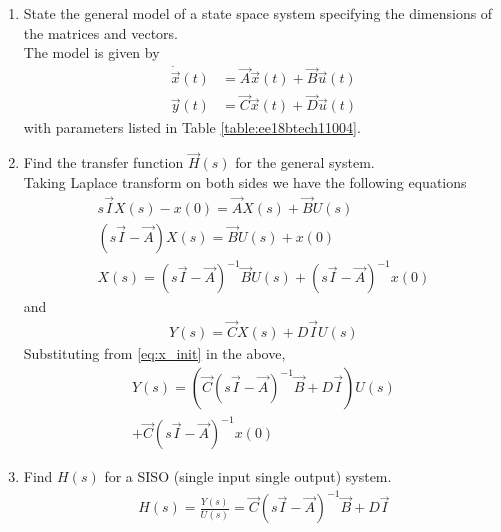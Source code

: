 
\begin{enumerate}[label=\thesection.\arabic*.,ref=\thesection.\theenumi]
\item State the general model of a state space system specifying the dimensions of the matrices and vectors.
\\
\solution The model is given by 
\begin{align}
\dot{\vec{x}}(t)&=\vec{A}\vec{x}(t)+\vec{B}\vec{u}(t) \\
 \vec{y}(t)&=\vec{C}\vec{x}(t)+\vec{D} \vec{u}(t)
\end{align}
%
with parameters listed in Table \ref{table:ee18btech11004}.
%
\begin{table}[!ht]
\centering

\caption{}
\label{table:ee18btech11004}
\end{table}
\item Find the transfer function $\vec{H}(s)$ for the general system.
\\
\solution 
Taking Laplace transform on both sides we have the following equations
\begin{align}
s\vec{I}X(s)-x(0)= \vec{A}X(s)+ \vec{B}U(s)\\
(s\vec{I}-\vec{A})X(s)= \vec{B}U(s)+ x(0)\\
X(s)={(s\vec{I}-\vec{A})^{-1}}\vec{B} U(s)+ (s\vec{I}-\vec{A})^{-1}x(0)
\label{eq:x_init}
\end{align}
and
\begin{align}
Y(s)= \vec{C}X(s)+D\vec{I}U(s)
\end{align}
Substituting from \eqref{eq:x_init} in the above,
%
\begin{multline}
Y(s)=( \vec{C}{(s\vec{I}-\vec{A})^{-1}}\vec{B}+D\vec{I}) U(s) 
\\
+ \vec{C}(s\vec{I}-\vec{A})^{-1}x(0)
\end{multline}
%
\item Find $H(s)$ for a SISO (single input single output) system.
\\
\solution
\begin{align}
H(s)= {\frac{Y(s)}{U(s)}}=  \vec{C}{(s\vec{I}-\vec{A})^{-1}}\vec{B}+D\vec{I}
\end{align}


\end{enumerate}
